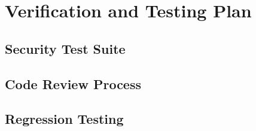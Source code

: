 \documentclass[../veristore_security_model.tex]{subfiles}
\begin{document}
\section{Verification and Testing Plan}


\subsection{Security Test Suite}


\subsection{Code Review Process}


\subsection{Regression Testing}


\newpage
\end{document}
